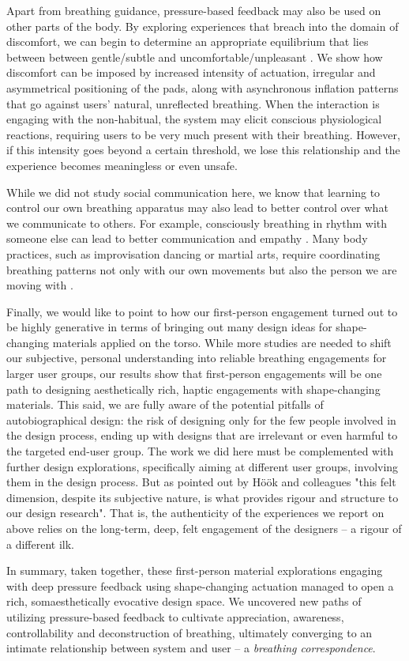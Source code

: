 Apart from breathing guidance, pressure-based feedback may also be used on other parts of the body. By exploring experiences that breach into the domain of discomfort, we can begin to determine an appropriate equilibrium that lies between between gentle/subtle and uncomfortable/unpleasant \cite{benford2012_uncomfortable}. We show how discomfort can be imposed by increased intensity of actuation, irregular and asymmetrical positioning of the pads, along with asynchronous inflation patterns that go against users' natural, unreflected breathing. When the interaction is engaging with the non-habitual, the system may elicit conscious physiological reactions, requiring users to be very much present with their breathing. However, if this intensity goes beyond a certain threshold, we lose this relationship and the experience becomes meaningless or even unsafe. 

While we did not study social communication here, we know that learning to control our own breathing apparatus may also lead to better control over what we communicate to others. For example, consciously breathing in rhythm with someone else can lead to better communication and empathy \cite{keller2014rhythm}. Many body practices, such as improvisation dancing or martial arts, require coordinating breathing patterns not only with our own movements but also the person we are moving with \cite{codrons2014spontaneous}. 

Finally, we would like to point to how our first-person engagement turned out to be highly generative in terms of bringing out many design ideas for shape-changing materials applied on the torso. While more studies are needed to shift our subjective, personal understanding into reliable breathing engagements for larger user groups, our results show that first-person engagements will be one path to designing aesthetically rich, haptic engagements with shape-changing materials. This said, we are fully aware of the potential pitfalls of autobiographical design: the risk of designing only for the few people involved in the design process, ending up with designs that are irrelevant or even harmful to the targeted end-user group. The work we did here must be complemented with further design explorations, specifically aiming at different user groups, involving them in the design process. But as pointed out by Höök and colleagues \cite{hook_embracing_2018} "this felt
dimension, despite its subjective nature, is what provides rigour and structure to our design research". That is, the authenticity of the experiences we report on above relies on the long-term, deep, felt engagement of the designers -- a rigour of a different ilk. 

In summary, taken together, these first-person material explorations engaging with deep pressure feedback using shape-changing actuation managed to open a rich, somaesthetically evocative design space. We uncovered new paths of utilizing pressure-based feedback to cultivate appreciation, awareness, controllability and deconstruction of breathing, ultimately converging to an intimate relationship between system and user -- a \textit{breathing correspondence}.